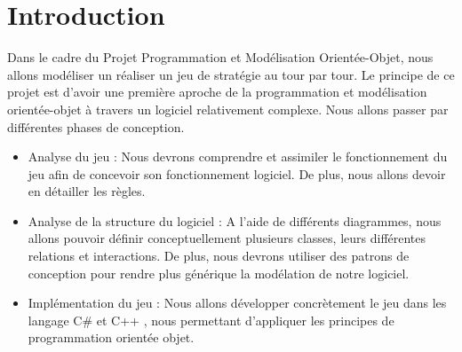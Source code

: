 \section{Introduction}

Dans le cadre du Projet Programmation et Modélisation Orientée-Objet, nous allons modéliser un réaliser un jeu de stratégie au tour par tour. \newline \newline
Le principe de ce projet est d'avoir une première aproche de la programmation et modélisation orientée-objet à travers un logiciel relativement complexe. Nous allons passer par différentes phases de conception.
\begin{itemize}
  \item Analyse du jeu : Nous devrons comprendre et assimiler le fonctionnement du jeu afin de concevoir son fonctionnement logiciel. De plus, nous allons devoir en détailler les règles.
  \item Analyse de la structure du logiciel :  A l'aide de différents diagrammes, nous allons pouvoir définir conceptuellement plusieurs classes, leurs différentes relations et interactions. De plus, nous devrons utiliser des patrons de conception pour rendre plus générique la modélation de notre logiciel.
  \item Implémentation du jeu : Nous allons développer concrètement le jeu dans les langage C\# et C++ , nous permettant d'appliquer les principes de programmation orientée objet.
\end{itemize}
